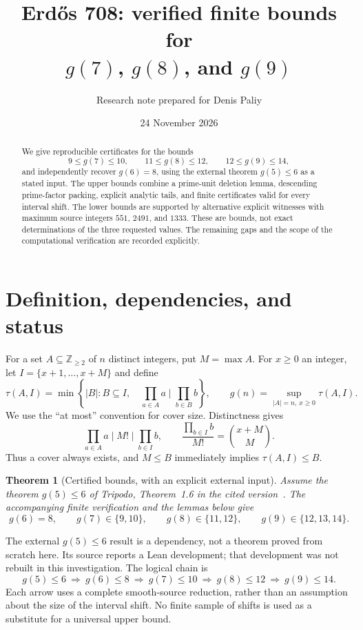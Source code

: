 \documentclass[11pt,a4paper]{article}
\title{Erd\H{o}s 708: verified finite bounds for\texorpdfstring{\\}{ }$g(7)$, $g(8)$, and $g(9)$}
\author{Research note prepared for Denis Paliy}
\date{24 November 2026}
\newtheorem{theorem}{Theorem}
\begin{document}
\maketitle
\begin{abstract}
We give reproducible certificates for the bounds
\[
  9\le g(7)\le10,\qquad 11\le g(8)\le12,\qquad 12\le g(9)\le14,
\]
and independently recover $g(6)=8$, using the external theorem $g(5)\le6$ as a stated input. The upper bounds combine a prime-unit deletion lemma, descending prime-factor packing, explicit analytic tails, and finite certificates valid for every interval shift. The lower bounds are supported by alternative explicit witnesses with maximum source integers $551$, $2491$, and $1333$. These are bounds, not exact determinations of the three requested values. The remaining gaps and the scope of the computational verification are recorded explicitly.
\end{abstract}

\section{Definition, dependencies, and status}
For a set $A\subseteq\mathbb Z_{\ge2}$ of $n$ distinct integers, put $M=\max A$. For $x\ge0$ an integer, let $I=\{x+1,\ldots,x+M\}$ and define
\[
 \tau(A,I)=\min\left\{|B|:B\subseteq I,\quad
                  \prod_{a\in A}a\mid\prod_{b\in B}b\right\},
 \qquad g(n)=\sup_{|A|=n,\ x\ge0}\tau(A,I).
\]
We use the ``at most'' convention for cover size. Distinctness gives
\begin{equation}\label{eq:whole}
 \prod_{a\in A}a\mid M!\mid \prod_{b\in I}b,
 \qquad \frac{\prod_{b\in I}b}{M!}=\binom{x+M}{M}.
\end{equation}
Thus a cover always exists, and $M\le B$ immediately implies $\tau(A,I)\le B$.

\begin{theorem}[Certified bounds, with an explicit external input]\label{thm:main}
Assume the theorem $g(5)\le6$ of Tripodo, Theorem~1.6 in the cited version~\cite{tripodo}. The accompanying finite verification and the lemmas below give
\[
 g(6)=8,\qquad g(7)\in\{9,10\},\qquad
 g(8)\in\{11,12\},\qquad g(9)\in\{12,13,14\}.
\]
\end{theorem}

The external $g(5)\le6$ result is a dependency, not a theorem proved from scratch here. Its source reports a Lean development; that development was not rebuilt in this investigation. The logical chain is
\[
 g(5)\le6\ \Longrightarrow\ g(6)\le8\ \Longrightarrow\ g(7)\le10
 \ \Longrightarrow\ g(8)\le12\ \Longrightarrow\ g(9)\le14.
\]
Each arrow uses a complete smooth-source reduction, rather than an assumption about the size of the interval shift. No finite sample of shifts is used as a substitute for a universal upper bound.
\end{document}
